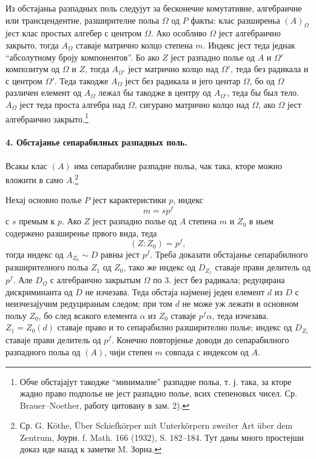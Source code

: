 ﻿\documentclass[11pt]{article}
\newcommand{\foreign}[1]{#1}
\providecommand{\glqq}{``}
\providecommand{\grqq}{''}
\begin{document}
Из обстајаньа разпадных поль следујут за бесконечне комутативне, алгебраичне или трансцендентне, разширителне польа \(\Omega\) од \(P\) факты: клас разширеньа \((A)_\Omega\) јест клас простых алгебер с центром \(\Omega\). Ако особливо \(\Omega\) јест алгебраично закрыто, тогда \(A_\Omega\) ставаје матрично колцо степена \(m\). Индекс јест теда једнак ``абсолутному броју компонентов''. Бо ако \(Z\) јест разпадно полье од \(A\) и \(\Omega'\) композитум од \(\Omega\) и \(Z\), тогда \(A_{\Omega'}\) јест матрично колцо над \(\Omega'\), теда без радикала и с центром \(\Omega'\). Теда такодже \(A_\Omega\) јест без радикала и јего центар \(\Omega\), бо од \(\Omega\) различен елемент од \(A_\Omega\) лежал бы такодже в центру од \(A_{\Omega'}\), теда бы был тело. \(A_\Omega\) јест теда проста алгебра над \(\Omega\), сигурано матрично колцо над \(\Omega\), ако \(\Omega\) јест алгебраично закрыто.\footnote{Обче обстајајут такодже \glqq{}минималне\grqq{} разпадне польа, т. ј. така, за кторе жадно право подполье не јест разпадно полье, всих степеновых чисел. Ср. Brauer--Noether, работу цитовану в зам. 2).}

\paragraph{4. Обстајанье сепарабилных разпадных поль.}
Всакы клас \((A)\) има сепарабилне разпадне польа, чак така, кторе можно вложити в само \(A\).\footnote{Ср. G. Köthe, \foreign{Über Schiefkörper mit Unterkörpern zweiter Art über dem Zentrum}, Јоурн. f. Math. 166 (1932), S. 182--184. Тут даны много простејши доказ иде назад к заметке M. Зорна.}

Нехај основно полье \(P\) јест карактеристики \(p\), индекс
\[
        m=s p^f
\]
с \(s\) премым к \(p\). Ако \(Z\) јест разпадно полье од \(A\) степена \(m\) и \(Z_0\) в ньем содержено разширенье првого вида, теда
\[
        (Z:Z_0)=p^f,
\]
тогда индекс од \(A_{Z_0}\sim D\) равны јест \(p^f\). Треба доказати обстајанье сепарабилного разширителного польа \(Z_1\) од \(Z_0\), тако же индекс од \(D_{Z_1}\) ставаје прави делитель од \(p^f\). Але \(D_\Omega\) с алгебраично закрытым \(\Omega\) по 3. јест без радикала; редуцирана дискриминанта од \(D\) не изчезава. Теда обстаја најменеј једен елемент \(d\) из \(D\) с неизчезајучим редуцираным следом; при том \(d\) не може уж лежати в основном польу \(Z_0\), бо след всакого елемента \(\alpha\) из \(Z_0\) ставаје \(p^f\alpha\), теда изчезава. \(Z_1=Z_0(d)\) ставаје право и то сепарабилно разширително полье; индекс од \(D_{Z_1}\) ставаје прави делитель од \(p^f\). Конечно повторјенье доводи до сепарабилного разпадного польа од \((A)\), чији степен \(m\) совпада с индексом од \(A\).
\end{document}
